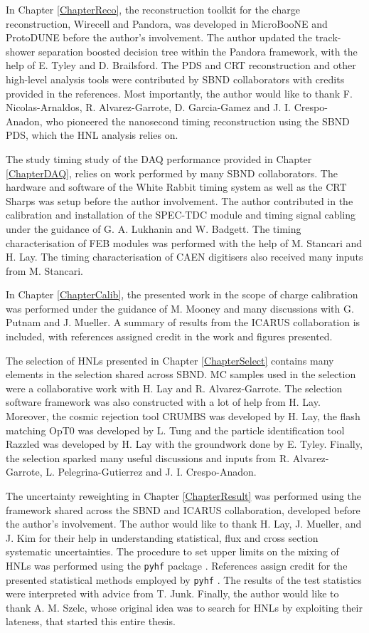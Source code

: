 \begin{declaration}
In Chapter \ref{ChapterReco}, the reconstruction toolkit for the charge reconstruction, Wirecell and Pandora, was developed in MicroBooNE and ProtoDUNE before the author's involvement.
The author updated the track-shower separation boosted decision tree within the Pandora framework, with the help of E. Tyley and D. Brailsford.
The PDS and CRT reconstruction and other high-level analysis tools were contributed by SBND collaborators with credits provided in the references.
Most importantly, the author would like to thank F. Nicolas-Arnaldos, R. Alvarez-Garrote, D. Garcia-Gamez and J. I. Crespo-Anadon, who pioneered the nanosecond timing reconstruction using the SBND PDS, which the HNL analysis relies on.

The study timing study of the DAQ performance provided in Chapter \ref{ChapterDAQ}, relies on work performed by many SBND collaborators.
The hardware and software of the White Rabbit timing system as well as the CRT Sharps was setup before the author involvement.
The author contributed in the calibration and installation of the SPEC-TDC module and timing signal cabling under the guidance of G. A. Lukhanin and W. Badgett.
The timing characterisation of FEB modules was performed with the help of M. Stancari and H. Lay.
The timing characterisation of CAEN digitisers also received many inputs from M. Stancari.  

In Chapter \ref{ChapterCalib}, the presented work in the scope of charge calibration was performed under the guidance of M. Mooney and many discussions with G. Putnam and J. Mueller.
A summary of results from the ICARUS collaboration is included, with references assigned credit in the work and figures presented.

The selection of HNLs presented in Chapter \ref{ChapterSelect} contains many elements in the selection shared across SBND.
MC samples used in the selection were a collaborative work with H. Lay and R. Alvarez-Garrote.
The selection software framework was also constructed with a lot of help from H. Lay. 
Moreover, the cosmic rejection tool CRUMBS was developed by H. Lay, the flash matching OpT0 was developed by L. Tung and the particle identification tool Razzled was developed by H. Lay with the groundwork done by E. Tyley.
Finally, the selection sparked many useful discussions and inputs from R. Alvarez-Garrote, L. Pelegrina-Gutierrez and J. I. Crespo-Anadon.

The uncertainty reweighting in Chapter \ref{ChapterResult} was performed using the framework shared across the SBND and ICARUS collaboration, developed before the author's involvement.
The author would like to thank H. Lay, J. Mueller, and J. Kim for their help in understanding statistical, flux and cross section systematic uncertainties.
The procedure to set upper limits on the mixing of HNLs was performed using the \texttt{pyhf} package \cite{pyhf}.
References assign credit for the presented statistical methods employed by \texttt{pyhf} \cite{asymptotic_test, CLs_Junk, CLs_Read}.
The results of the test statistics were interpreted with advice from T. Junk.
Finally, the author would like to thank A. M. Szelc, whose original idea was to search for HNLs by exploiting their lateness, that started this entire thesis.  


\end{declaration}
